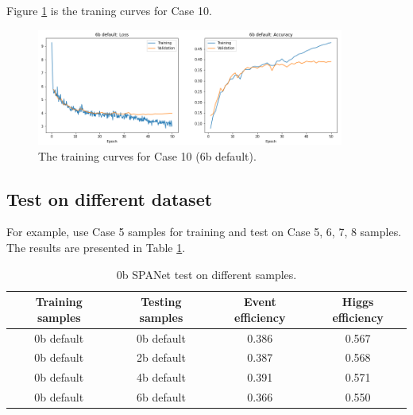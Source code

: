 \documentclass[12pt]{article}
\begin{document}
		Figure \ref{fig:loss_and_accuracy_curve_6b_default} is the traning curves for Case 10. 
		\begin{figure}[htpb]
			\centering
			\includegraphics[width=0.9\textwidth]{loss_and_accuracy_curve_6b_default.png}
			\caption{The training curves for Case 10 (6b default).}
			\label{fig:loss_and_accuracy_curve_6b_default}
		\end{figure}
	\subsection{Test on different dataset}%
	\label{sub:test_on_different_dataset}
		For example, use Case 5 samples for training and test on Case 5, 6, 7, 8 samples. The results are presented in Table \ref{tab:SPANet_1M_0b_default_test_on_different_triHiggs_data}.
		\begin{table}[htpb]
			\centering
			\caption{0b SPANet test on different samples.}
			\label{tab:SPANet_1M_0b_default_test_on_different_triHiggs_data}
			\begin{tabular}{cc|cc}
				Training samples & Testing samples & Event efficiency & Higgs efficiency \\
				\hline 
				0b default      & 0b default     & 0.386        & 0.567    \\
				0b default      & 2b default     & 0.387        & 0.568    \\
				0b default      & 4b default     & 0.391        & 0.571    \\
				0b default      & 6b default     & 0.366        & 0.550    \\
			\end{tabular}
		\end{table}	
\end{document}
